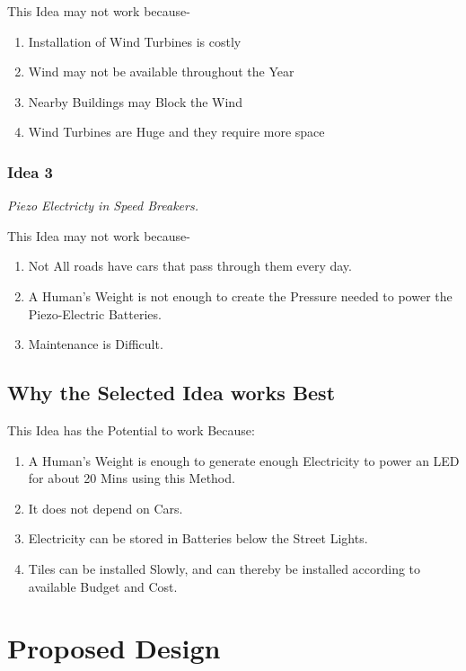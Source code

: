 \documentclass[11pt]{article}
\begin{document}
This Idea may not work because- 
\begin{enumerate}
	\item Installation of Wind Turbines is costly
	\item Wind may not be available throughout the Year
	\item Nearby Buildings may Block the Wind
	\item Wind Turbines are Huge and they require more space
\end{enumerate}

\subsubsection{Idea 3}
\textit{Piezo Electricty in Speed Breakers.}

This Idea may not work because- 
\begin{enumerate}
	\item Not All roads have cars that pass through them every day. 
	\item A Human's Weight is not enough to create the Pressure needed to power the Piezo-Electric Batteries. 
	\item Maintenance is Difficult. 
\end{enumerate}

\subsection{Why the Selected Idea works Best}
This Idea has the Potential to work Because:
\begin{enumerate}
	\item A Human's Weight is enough to generate enough Electricity to power an LED for about 20 Mins using this Method. 
	\item It does not depend on Cars.
	\item Electricity can be stored in Batteries below the Street Lights.
	\item Tiles can be installed Slowly, and can thereby be installed according to available Budget and Cost.
\end{enumerate}
\section{Proposed Design}
\end{document}
